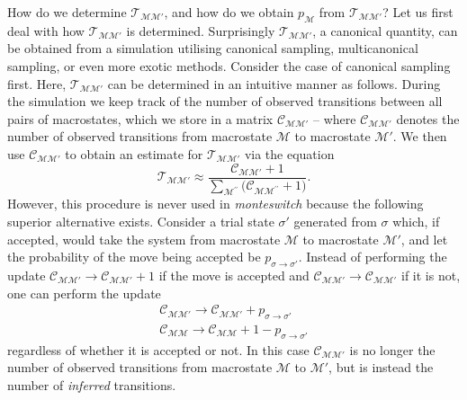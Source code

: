 \documentclass{report}
\begin{document}
How do we determine $\mathcal{T}_{\mathcal{MM}'}$, and how do we obtain $p_{\mathcal{M}}$ from $\mathcal{T}_{\mathcal{MM}'}$? Let us first deal with how
$\mathcal{T}_{\mathcal{MM}'}$ is determined.
Surprisingly $\mathcal{T}_{\mathcal{MM}'}$, a canonical quantity, can be obtained from a simulation utilising canonical sampling, multicanonical sampling,
or even more exotic methods. Consider the case of canonical sampling first.
Here, $\mathcal{T}_{\mathcal{MM}'}$ can be determined in an intuitive manner as follows. During the simulation we keep track of the 
number of observed transitions between all pairs of macrostates, which we store in a matrix $\mathcal{C}_{\mathcal{M}\mathcal{M}'}$ -- where $\mathcal{C}_{\mathcal{M}\mathcal{M}'}$
denotes the number of observed transitions from macrostate $\mathcal{M}$ to macrostate $\mathcal{M}'$. We then use $\mathcal{C}_{\mathcal{M}\mathcal{M}'}$ to obtain
an estimate for $\mathcal{T}_{\mathcal{M}\mathcal{M}'}$ via the equation
\begin{equation}\label{T_estimate}
\mathcal{T}_{\mathcal{M}\mathcal{M}'}\approx \frac{\mathcal{C}_{\mathcal{M}\mathcal{M}'}+1}
{\displaystyle\sum_{\mathcal{M}^{\prime\prime}}\bigl(\mathcal{C}_{\mathcal{M}\mathcal{M}^{\prime\prime}}+1\bigr)}.
\end{equation}
However, this procedure is never used in \emph{monteswitch} because the following superior alternative exists. Consider a trial state $\sigma'$ 
generated from $\sigma$ which, if accepted, would take the system from macrostate $\mathcal{M}$ to macrostate $\mathcal{M}'$, and let the probability 
of the move being accepted be $p_{\sigma\to\sigma'}$. Instead of performing the update $\mathcal{C}_{\mathcal{M}\mathcal{M}'}\to \mathcal{C}_{\mathcal{M}\mathcal{M}'}+1$ if the move is 
accepted and $\mathcal{C}_{\mathcal{M}\mathcal{M}'}\to \mathcal{C}_{\mathcal{M}\mathcal{M}'}$ if it is not, one can perform the update 
\begin{equation}
\begin{split}
\mathcal{C}_{\mathcal{M}\mathcal{M}'}\to \mathcal{C}_{\mathcal{M}\mathcal{M}'}+p_{\sigma\to\sigma'} \\
\mathcal{C}_{\mathcal{M}\mathcal{M}}\to \mathcal{C}_{\mathcal{M}\mathcal{M}}+1-p_{\sigma\to\sigma'}
\end{split}
\end{equation} 
regardless of whether it is accepted or not. In this case $\mathcal{C}_{\mathcal{M}\mathcal{M}'}$ is no longer the number of observed transitions from macrostate 
$\mathcal{M}$ to $\mathcal{M}'$, but is instead the number of \emph{inferred} transitions. 
\end{document}
